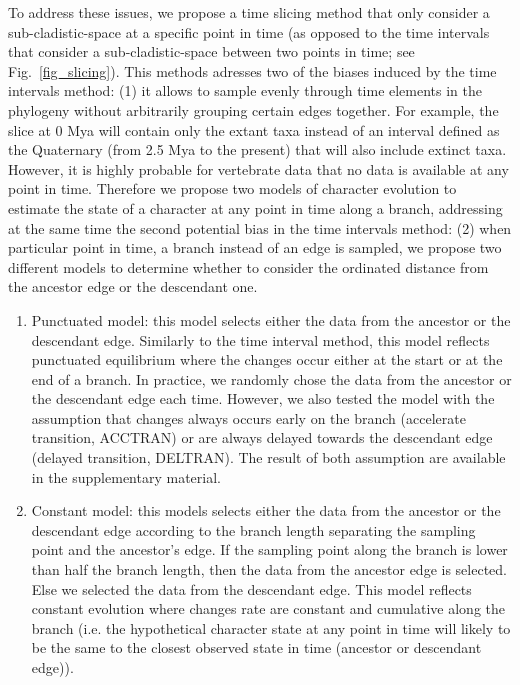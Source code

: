 \documentclass[12pt,letterpaper]{article}
\begin{document}
To address these issues, we propose a time slicing method that only consider a sub-cladistic-space at a specific point in time (as opposed to the time intervals that consider a sub-cladistic-space between two points in time; see Fig.~\ref{fig_slicing}). This methods adresses two of the biases induced by the time intervals method: (1) it allows to sample evenly through time elements in the phylogeny without arbitrarily grouping certain edges together. For example, the slice at 0 Mya will contain only the extant taxa instead of an interval defined as the Quaternary (from 2.5 Mya to the present) that will also include extinct taxa. However, it is highly probable for vertebrate data that no data is available at any point in time. Therefore we propose two models of character evolution to estimate the state of a character at any point in time along a branch, addressing at the same time the second potential bias in the time intervals method: (2) when particular point in time, a branch instead of an edge is sampled, we propose two different models to determine whether to consider the ordinated distance from the ancestor edge or the descendant one.
\begin{enumerate}
\item{Punctuated model:} this model selects either the data from the ancestor or the descendant edge. Similarly to the time interval method, this model reflects punctuated equilibrium where the changes occur either at the start or at the end of a branch. In practice, we randomly chose the data from the ancestor or the descendant edge each time. However, we also tested the model with the assumption that changes always occurs early on the branch (accelerate transition, ACCTRAN) or are always delayed towards the descendant edge (delayed transition, DELTRAN). The result of both assumption are available in the supplementary material.
\item{Constant model:} this models selects either the data from the ancestor or the descendant edge according to the branch length separating the sampling point and the ancestor's edge. If the sampling point along the branch is lower than half the branch length, then the data from the ancestor edge is selected. Else we selected the data from the descendant edge. This model reflects constant evolution where changes rate are constant and cumulative along the branch (i.e. the hypothetical character state at any point in time will likely to be the same to the closest observed state in time (ancestor or descendant edge)).
\end{enumerate}
\end{document}
